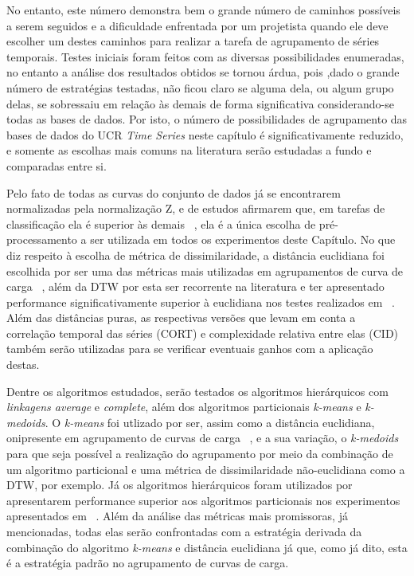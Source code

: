  No entanto, este número demonstra bem o grande número de caminhos possíveis a serem seguidos e a dificuldade enfrentada por um projetista quando ele deve escolher um destes caminhos para realizar a tarefa de agrupamento de séries temporais. Testes iniciais foram feitos com as diversas possibilidades enumeradas, no entanto a análise dos resultados obtidos se tornou árdua, pois ,dado o grande número de estratégias testadas, não ficou claro se alguma dela, ou algum grupo delas, se sobressaiu em relação às demais de forma significativa considerando-se todas as bases de dados. Por isto, o número de possibilidades de agrupamento das bases de dados do UCR \emph{Time Series} neste capítulo é significativamente reduzido, e somente as escolhas mais comuns na literatura serão estudadas a fundo e comparadas entre si. 
 
 Pelo fato de todas as curvas do conjunto de dados já se encontrarem normalizadas pela normalização Z, e de estudos afirmarem que, em tarefas de classificação ela é superior às demais ~\parencite{trillions}, ela é a única escolha de pré-processamento a ser utilizada em todos os experimentos deste Capítulo. No que diz respeito à escolha de métrica de dissimilaridade, a distância euclidiana foi escolhida por ser uma das métricas mais utilizadas em agrupamentos de curva de carga ~\parencite{Chicco}, além da DTW por esta ser recorrente na literatura e ter apresentado performance significativamente superior à euclidiana nos testes realizados em ~\parencite{BatistaComparativo}. Além das distâncias puras, as respectivas versões que levam em conta a correlação temporal das séries (CORT) e complexidade relativa entre elas (CID) também serão utilizadas para se verificar eventuais ganhos com a aplicação destas.
 
Dentre os algoritmos estudados, serão testados os algoritmos hierárquicos com \emph{linkagens average} e \emph{complete}, além dos algoritmos particionais \emph{k-means} e \emph{k-medoids}. O \emph{k-means} foi utlizado por ser, assim como a distância euclidiana, onipresente em agrupamento de curvas de carga ~\parencite{Chicco}, e a sua variação, o \emph{k-medoids} para que seja possível a realização do agrupamento por meio da combinação de um algoritmo particional e uma métrica de dissimilaridade não-euclidiana como a DTW, por exemplo. Já os algoritmos hierárquicos foram utilizados por apresentarem performance superior aos algoritmos particionais nos experimentos apresentados em ~\parencite{k_shape}. Além da análise das métricas mais promissoras, já mencionadas, todas elas serão confrontadas com a estratégia derivada da combinação do algoritmo \emph{k-means} e distância euclidiana já que, como já dito, esta é a estratégia padrão no agrupamento de curvas de carga.

